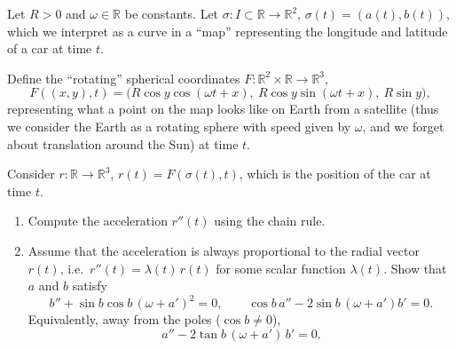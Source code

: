 \begin{exercise}
\label{ex:5.7}
Let $R > 0$ and $\omega \in \mathbb{R}$ be constants. Let
$\sigma : I \subset \mathbb{R}\to\mathbb{R}^2$, $\sigma(t) = (a(t), b(t))$, which we interpret as
a curve in a ``map'' representing the longitude and latitude of a car at time $t$.

Define the ``rotating'' spherical coordinates $F : \mathbb{R}^2\times\mathbb{R}\to\mathbb{R}^3$,
$$F((x,y),t) = \big(R\cos y\cos(\omega t + x),\ R\cos y\sin(\omega t + x),\ R\sin y\big),$$
representing what a point on the map looks like on Earth from a satellite (thus we consider the
Earth as a rotating sphere with speed given by $\omega$, and we forget about translation around
the Sun) at time $t$.

Consider $r : \mathbb{R}\to\mathbb{R}^3$, $r(t) = F(\sigma(t), t)$, which is the position of the
car at time $t$.
\begin{enumerate}[label=\textbf{\arabic*.}]
  \item Compute the acceleration $r''(t)$ using the chain rule.
  \item Assume that the acceleration is always proportional to the radial vector $r(t)$, i.e.\
    $r''(t) = \lambda(t)\,r(t)$ for some scalar function $\lambda(t)$. Show that $a$ and $b$
    satisfy
    $$b'' + \sin b\cos b\,(\omega+a')^2 = 0, \qquad \cos b\,a'' - 2\sin b\,(\omega+a')b' = 0.$$
    Equivalently, away from the poles ($\cos b \neq 0$),
    $$a'' - 2\tan b\,(\omega+a')\,b' = 0.$$
\end{enumerate}
\end{exercise}
